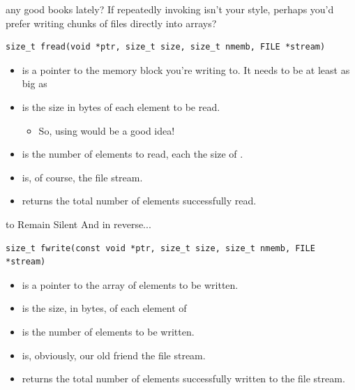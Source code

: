 \documentclass[11pt]{beamer}
\let\OldTexttt\texttt
\renewcommand{\texttt}[1]{\OldTexttt{\color{teal}{#1}}}
\begin{document}
\begin{frame}[fragile=singleslide]{\texttt{fread()} any good books lately?}
If repeatedly invoking \texttt{fscanf()} isn't your style, perhaps you'd prefer writing chunks of files directly into arrays?
\begin{lstlisting}[style=C]
size_t fread(void *ptr, size_t size, size_t nmemb, FILE *stream)
\end{lstlisting}
\begin{itemize}
\item \texttt{ptr} is a pointer to the memory block you're writing to.  It needs to be at least as big as \texttt{size*nmemb}
\item \texttt{size} is the size in bytes of each element to be read.  
\begin{itemize}
\item So, using \texttt{sizeof()} would be a good idea!
\end{itemize}
\item \texttt{nmemb} is the number of elements to read, each the size of \texttt{size}.
\item \texttt{stream} is, of course, the file stream.
\item \texttt{fread()} returns the total number of elements successfully read.
\end{itemize}
\end{frame}


\begin{frame}[fragile=singleslide]{\texttt{fwrite()} to Remain Silent}
And in reverse...
\begin{lstlisting}[style=C]
size_t fwrite(const void *ptr, size_t size, size_t nmemb, FILE *stream)
\end{lstlisting}
\begin{itemize}
\item \texttt{ptr} is a pointer to the array of elements to be written.
\item \texttt{size} is the size, in bytes, of each element of \texttt{ptr}
\item \texttt{nmemb} is the number of elements to be written.
\item \texttt{stream} is, obviously, our old friend the file stream.  
\item \texttt{fwrite()} returns the total number of elements successfully written to the file stream.  
\end{itemize}
\end{frame}
\end{document}

